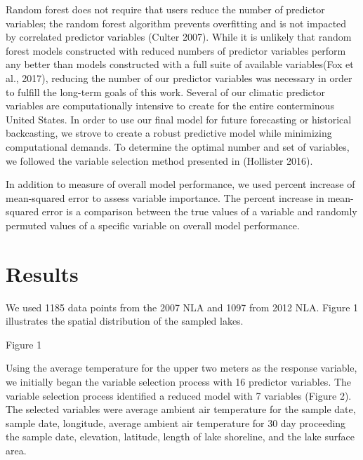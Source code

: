\documentclass[
]{article}
\begin{document}
Random forest does not require that users reduce the number of predictor
variables; the random forest algorithm prevents overfitting and is not
impacted by correlated predictor variables (Culter 2007). While it is
unlikely that random forest models constructed with reduced numbers of
predictor variables perform any better than models constructed with a
full suite of available variables(Fox et al., 2017), reducing the number
of our predictor variables was necessary in order to fulfill the
long-term goals of this work. Several of our climatic predictor
variables are computationally intensive to create for the entire
conterminous United States. In order to use our final model for future
forecasting or historical backcasting, we strove to create a robust
predictive model while minimizing computational demands. To determine
the optimal number and set of variables, we followed the variable
selection method presented in (Hollister 2016).

In addition to measure of overall model performance, we used percent
increase of mean-squared error to assess variable importance. The
percent increase in mean-squared error is a comparison between the true
values of a variable and randomly permuted values of a specific variable
on overall model performance.

\hypertarget{results}{%
\section{Results}\label{results}}

We used 1185 data points from the 2007 NLA and 1097 from 2012 NLA.
Figure 1 illustrates the spatial distribution of the sampled lakes.

Figure 1

Using the average temperature for the upper two meters as the response
variable, we initially began the variable selection process with 16
predictor variables. The variable selection process identified a reduced
model with 7 variables (Figure 2). The selected variables were average
ambient air temperature for the sample date, sample date, longitude,
average ambient air temperature for 30 day proceeding the sample date,
elevation, latitude, length of lake shoreline, and the lake surface
area.
\end{document}
